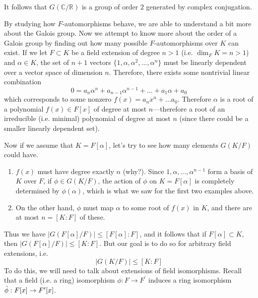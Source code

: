   \begin{example}
    It follows that $G(\mathbb{C}/\mathbb{R})$ is a group of order $2$ generated by complex conjugation. 
  \end{example} 

  By studying how $F$-automorphisms behave, we are able to understand a bit more about the Galois group. Now we attempt to know more about the order of a Galois group by finding out how many possible $F$-automorphisms over $K$ can exist. If we let $F \subset K$ be a field extension of degree $n >1$ (i.e. $\dim_F K = n > 1$) and $\alpha \in K$, the set of $n+1$ vectors $\{1, \alpha, \alpha^2, \ldots, \alpha^n\}$ must be linearly dependent over a vector space of dimension $n$. Therefore, there exists some nontrivial linear combination 
  \begin{equation}
    0 = a_n \alpha^n + a_{n-1} \alpha^{n-1} + \ldots + a_1 \alpha + a_0
  \end{equation} 
  which corresponds to some nonzero $f(x) = a_n x^n + \ldots a_0$. Therefore $\alpha$ is a root of a polynomial $f(x) \in F[x]$ of degree at most $n$---therefore a root of an irreducible (i.e. minimal) polynomial of degree at most $n$ (since there could be a smaller linearly dependent set). 

  Now if we assume that $K = F[\alpha]$, let's try to see how many elements $G(K/F)$ could have. 
  \begin{enumerate}
    \item $f(x)$ must have degree exactly $n$ (why?). Since $1, \alpha, \ldots, \alpha^{n-1}$ form a basis of $K$ over $F$, if $\phi \in G(K/F)$, the action of $\phi$ on $K = F[\alpha]$ is completely determined by $\phi(\alpha)$, which is what we saw for the first two examples above. 
    \item On the other hand, $\phi$ must map $\alpha$ to some root of $f(x)$ in $K$, and there are at most $n = [K:F]$ of these. 
  \end{enumerate}
  Thus we have $|G(F[\alpha]/F)| \leq [F[\alpha]:F]$, and it follows that if $F[\alpha] \subset K$, then $|G(F[\alpha]/F)| \leq [K:F]$. But our goal is to do so for arbitrary field extensions, i.e. 
  \begin{equation}
    |G(K/F)| \leq [K:F]
  \end{equation} 
  To do this, we will need to talk about extensions of field isomorphisms. Recall that a field (i.e. a ring) isomorphism $\phi: F \to F^\prime$ induces a ring isomorphism $\Tilde{\phi}: F[x] \to F^\prime [x]$. 


